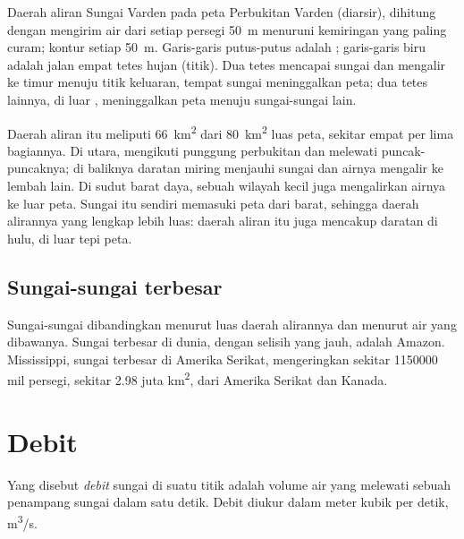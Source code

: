\begin{omfigure}
{\small Daerah aliran Sungai Varden pada peta Perbukitan Varden (diarsir),
dihitung dengan mengirim air dari setiap persegi \qty{50}{m} menuruni
kemiringan yang paling curam; kontur setiap \qty{50}{m}. Garis-garis
putus-putus adalah ; garis-garis biru adalah jalan empat
tetes hujan (titik). Dua tetes mencapai sungai dan mengalir ke timur menuju
titik keluaran, tempat sungai meninggalkan peta; dua tetes lainnya, di luar
, meninggalkan peta menuju sungai-sungai lain.}
\end{omfigure}

Daerah aliran itu meliputi \qty{66}{km^2} dari \qty{80}{km^2} luas peta,
sekitar empat per lima bagiannya. Di utara,  mengikuti
punggung perbukitan dan melewati puncak-puncaknya; di baliknya daratan miring
menjauhi sungai dan airnya mengalir ke lembah lain. Di sudut barat daya,
sebuah wilayah kecil juga mengalirkan airnya ke luar peta. Sungai itu sendiri
memasuki peta dari barat, sehingga daerah alirannya yang lengkap lebih luas:
daerah aliran itu juga mencakup daratan di hulu, di luar tepi peta.

\subsection*{Sungai-sungai terbesar}

Sungai-sungai dibandingkan menurut luas daerah alirannya dan menurut air yang
dibawanya. Sungai terbesar di dunia, dengan selisih yang jauh, adalah Amazon.
Mississippi, sungai terbesar di Amerika Serikat, mengeringkan sekitar
\num{1150000} mil persegi, sekitar 2.98 juta \unit{km^2}, dari Amerika Serikat
dan Kanada.

\section{Debit}

\begin{definition}[Debit]\label{def:g10:drainage-basins:discharge}
Yang disebut \emph{debit} sungai di suatu titik adalah volume air
yang melewati sebuah penampang sungai dalam satu detik. Debit diukur dalam
meter kubik per detik, \unit{m^3/s}.
\end{definition}

